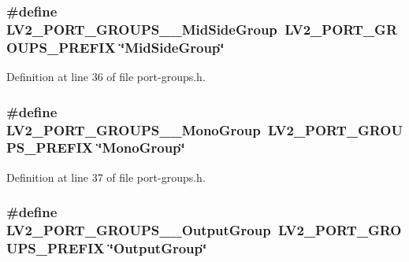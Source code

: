 \subsubsection[{\texorpdfstring{L\+V2\+\_\+\+P\+O\+R\+T\+\_\+\+G\+R\+O\+U\+P\+S\+\_\+\+\_\+\+Mid\+Side\+Group}{LV2_PORT_GROUPS__MidSideGroup}}]{\setlength{\rightskip}{0pt plus 5cm}\#define L\+V2\+\_\+\+P\+O\+R\+T\+\_\+\+G\+R\+O\+U\+P\+S\+\_\+\+\_\+\+Mid\+Side\+Group~{\bf L\+V2\+\_\+\+P\+O\+R\+T\+\_\+\+G\+R\+O\+U\+P\+S\+\_\+\+P\+R\+E\+F\+IX} \char`\"{}Mid\+Side\+Group\char`\"{}}\hypertarget{port-groups_8h_a32df778b2385b14a7f22f8cfc53bb1aa}{}\label{port-groups_8h_a32df778b2385b14a7f22f8cfc53bb1aa}


Definition at line 36 of file port-\/groups.\+h.

\subsubsection[{\texorpdfstring{L\+V2\+\_\+\+P\+O\+R\+T\+\_\+\+G\+R\+O\+U\+P\+S\+\_\+\+\_\+\+Mono\+Group}{LV2_PORT_GROUPS__MonoGroup}}]{\setlength{\rightskip}{0pt plus 5cm}\#define L\+V2\+\_\+\+P\+O\+R\+T\+\_\+\+G\+R\+O\+U\+P\+S\+\_\+\+\_\+\+Mono\+Group~{\bf L\+V2\+\_\+\+P\+O\+R\+T\+\_\+\+G\+R\+O\+U\+P\+S\+\_\+\+P\+R\+E\+F\+IX} \char`\"{}Mono\+Group\char`\"{}}\hypertarget{port-groups_8h_a0f41c73c6bc5e1745aefd5bf84112428}{}\label{port-groups_8h_a0f41c73c6bc5e1745aefd5bf84112428}


Definition at line 37 of file port-\/groups.\+h.

\subsubsection[{\texorpdfstring{L\+V2\+\_\+\+P\+O\+R\+T\+\_\+\+G\+R\+O\+U\+P\+S\+\_\+\+\_\+\+Output\+Group}{LV2_PORT_GROUPS__OutputGroup}}]{\setlength{\rightskip}{0pt plus 5cm}\#define L\+V2\+\_\+\+P\+O\+R\+T\+\_\+\+G\+R\+O\+U\+P\+S\+\_\+\+\_\+\+Output\+Group~{\bf L\+V2\+\_\+\+P\+O\+R\+T\+\_\+\+G\+R\+O\+U\+P\+S\+\_\+\+P\+R\+E\+F\+IX} \char`\"{}Output\+Group\char`\"{}}\hypertarget{port-groups_8h_a367fa1ea08e237df092aefb5beb40c64}{}\label{port-groups_8h_a367fa1ea08e237df092aefb5beb40c64}



